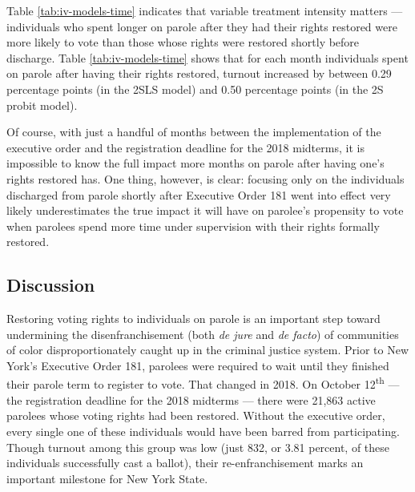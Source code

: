 \documentclass[
  12pt,
]{article}
\begin{document}
Table \ref{tab:iv-models-time} indicates that variable treatment intensity matters --- individuals who spent longer on parole after they had their rights restored were more likely to vote than those whose rights were restored shortly before discharge. Table \ref{tab:iv-models-time} shows that for each month individuals spent on parole after having their rights restored, turnout increased by between 0.29 percentage points (in the 2SLS model) and 0.50 percentage points (in the 2S probit model).

Of course, with just a handful of months between the implementation of the executive order and the registration deadline for the 2018 midterms, it is impossible to know the full impact more months on parole after having one's rights restored has. One thing, however, is clear: focusing only on the individuals discharged from parole shortly after Executive Order 181 went into effect very likely underestimates the true impact it will have on parolee's propensity to vote when parolees spend more time under supervision with their rights formally restored.

\hypertarget{discussion}{%
\subsection*{Discussion}\label{discussion}}

Restoring voting rights to individuals on parole is an important step toward undermining the disenfranchisement (both \emph{de jure} and \emph{de facto}) of communities of color disproportionately caught up in the criminal justice system. Prior to New York's Executive Order 181, parolees were required to wait until they finished their parole term to register to vote. That changed in 2018. On October 12\textsuperscript{th} --- the registration deadline for the 2018 midterms --- there were 21,863 active parolees whose voting rights had been restored. Without the executive order, every single one of these individuals would have been barred from participating. Though turnout among this group was low (just 832, or 3.81 percent, of these individuals successfully cast a ballot), their re-enfranchisement marks an important milestone for New York State.
\end{document}
